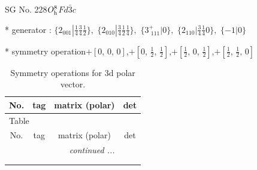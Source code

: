 \documentclass[fleqn,8pt]{jsarticle}
\begin{document}
\setcounter{MaxMatrixCols}{32}

\renewcommand{\tablename}{Table~}
\renewcommand{\figurename}{Figure~}
\begin{center}
\LARGE
SG No. 228\quad$O_{\rm h}^{8}$\quad$Fd\bar{3}c$\quad[ cubic ]
\end{center}

* generator : $\{2{}_{001}|\frac{1}{4} \frac{3}{4} \frac{1}{2}\},\,\,\{2{}_{010}|\frac{3}{4} \frac{1}{2} \frac{1}{4}\},\,\,\{3^{+}_{\,\,111}|0\},\,\,\{2{}_{110}|\frac{3}{4} \frac{1}{4} 0\},\,\,\{-1|0\}$

* symmetry operation\quad$+\left[ 0,\, 0,\, 0 \right]$,\quad $+\left[ 0,\, \frac{1}{2},\, \frac{1}{2} \right]$,\quad $+\left[ \frac{1}{2},\, 0,\, \frac{1}{2} \right]$,\quad $+\left[ \frac{1}{2},\, \frac{1}{2},\, 0 \right]$
\renewcommand{\arraystretch}{1.3}
\begin{longtable}{cccc}
\caption{Symmetry operations for 3d polar vector.}
 \\
 \hline \hline
No. & tag & matrix (polar) & det \\ \hline \endfirsthead

\multicolumn{3}{l}{\tablename\ \thetable{}} \\
 \hline \hline
No. & tag & matrix (polar) & det \\ \hline \endhead

 \hline \hline
\multicolumn{3}{r}{\footnotesize\it continued ...} \\ \endfoot

 \hline \hline
\multicolumn{3}{r}{} \\ \endlastfoot


\end{longtable}
\end{document}
